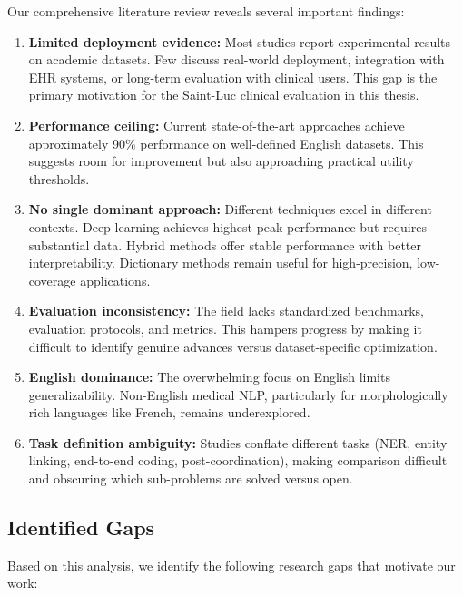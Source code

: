 Our comprehensive literature review reveals several important findings:

\begin{enumerate}
    \item \textbf{Limited deployment evidence:} Most studies report experimental results on academic datasets. Few discuss real-world deployment, integration with EHR systems, or long-term evaluation with clinical users. This gap is the primary motivation for the Saint-Luc clinical evaluation in this thesis.

    \item \textbf{Performance ceiling:} Current state-of-the-art approaches achieve approximately 90\% performance on well-defined English datasets. This suggests room for improvement but also approaching practical utility thresholds.

    \item \textbf{No single dominant approach:} Different techniques excel in different contexts. Deep learning achieves highest peak performance but requires substantial data. Hybrid methods offer stable performance with better interpretability. Dictionary methods remain useful for high-precision, low-coverage applications.

    \item \textbf{Evaluation inconsistency:} The field lacks standardized benchmarks, evaluation protocols, and metrics. This hampers progress by making it difficult to identify genuine advances versus dataset-specific optimization.

    \item \textbf{English dominance:} The overwhelming focus on English limits generalizability. Non-English medical NLP, particularly for morphologically rich languages like French, remains underexplored.

    \item \textbf{Task definition ambiguity:} Studies conflate different tasks (NER, entity linking, end-to-end coding, post-coordination), making comparison difficult and obscuring which sub-problems are solved versus open.
\end{enumerate}

\subsection{Identified Gaps}

Based on this analysis, we identify the following research gaps that motivate our work:


